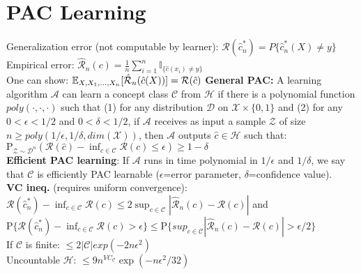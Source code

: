 \section{PAC Learning}

Generalization error (not computable by learner): $\mathcal{R}(\hat{c}_n^*) = P\{ \hat{c}_n^*(X)\neq y \}$ \\
Empirical error: $\hat{\mathcal{R}}_n(c) = \tfrac{1}{n}\sum_{i=1}^n \mathbb{I}_{\{\hat c(x_i)\neq y\}}$ \\
One can show: $\mathbb E_{X,X_1,...,X_n}[\hat{\mathcal{R}}_n(\hat c(X))]=\mathcal{R}(\hat c)$
\textbf{General PAC:} A learning algorithm $\mathcal{A}$ can learn a concept class $\mathcal{C}$ from $\mathcal{H}$ if there is a polynomial function $poly(\cdot,\cdot,\cdot)$ such that (1) for any distribution $\mathcal{D}$ on $\mathcal{X} \times \{0,1\}$ and (2) for any $0<\epsilon<1/2$ and $0<\delta<1/2$, if $\mathcal{A}$ receives as input a sample $\mathcal{Z}$ of size $n\geq poly(1/\epsilon,1/\delta,dim(\mathcal{X}))$, then $\mathcal{A}$ outputs $\hat c \in \mathcal{H}$ such that: $\mathrm{P}_{\mathcal{Z}\sim\mathcal{D}^n}(\mathcal{R}(\hat c)-\inf_{c\in\mathcal{C}}\mathcal{R}(c)\leq\epsilon)\geq 1-\delta$\\
\textbf{Efficient PAC learning}: If $\mathcal{A}$ runs in time polynomial in $1/\epsilon$ and $1/\delta$, we say that $\mathcal{C}$ is efficiently PAC learnable ($\epsilon$=error parameter, $\delta$=confidence value).\\
\textbf{VC ineq.} (requires uniform convergence): $\mathcal{R}(\hat c_n^*)-\inf_{c\in \mathcal{C}} \mathcal{R}(c) \leq 2\sup_{c\in \mathcal{C}}|\hat{\mathcal{R}}_n(c) - \mathcal{R}(c)|$ and
$\mathrm{P}\{\mathcal{R}(\hat c_n^*)-\inf_{c\in \mathcal{C}} \mathcal{R}(c)>\epsilon\} \leq \mathrm{P}\{sup_{c\in \mathcal{C}}|\hat{\mathcal{R}}_n(c) - \mathcal{R}(c)|>\epsilon/2\}$\\
If $\mathcal{C}$ is finite: $\leq 2|\mathcal{C}| exp(-2n\epsilon ^2)$\\
Uncountable $\mathcal{H}$: $\leq 9n^{VC_\mathcal{C}}\exp(-n\epsilon^2/32)$




